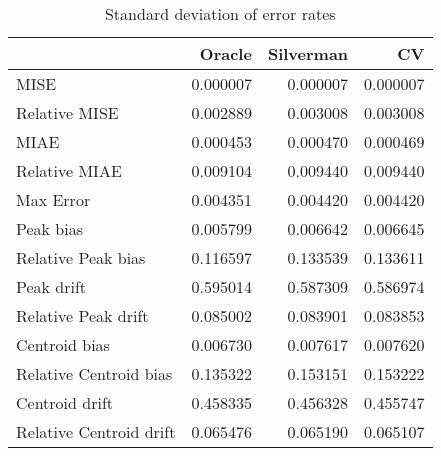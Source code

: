 \begin{table}[H]
\centering
\begin{tabular}{lrrr}
  \hline
 & Oracle & Silverman & CV \\ 
  \hline
MISE & 0.000007 & 0.000007 & 0.000007 \\ 
  Relative MISE & 0.002889 & 0.003008 & 0.003008 \\ 
  MIAE & 0.000453 & 0.000470 & 0.000469 \\ 
  Relative MIAE & 0.009104 & 0.009440 & 0.009440 \\ 
  Max Error & 0.004351 & 0.004420 & 0.004420 \\ 
  Peak bias & 0.005799 & 0.006642 & 0.006645 \\ 
  Relative Peak bias & 0.116597 & 0.133539 & 0.133611 \\ 
  Peak drift & 0.595014 & 0.587309 & 0.586974 \\ 
  Relative Peak drift & 0.085002 & 0.083901 & 0.083853 \\ 
  Centroid bias & 0.006730 & 0.007617 & 0.007620 \\ 
  Relative Centroid bias & 0.135322 & 0.153151 & 0.153222 \\ 
  Centroid drift & 0.458335 & 0.456328 & 0.455747 \\ 
  Relative Centroid drift & 0.065476 & 0.065190 & 0.065107 \\ 
   \hline
\end{tabular}
\caption{Standard deviation of error rates} 
\label{tbl:stddev_error_rates}
\end{table}
